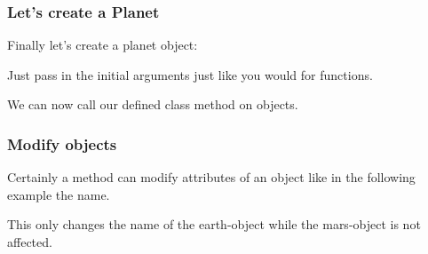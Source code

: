 \documentclass{beamer}
\begin{document}
\begin{frame}
  \frametitle{Let's create a Planet}
  Finally let's create a planet object: 
  
  Just pass in the initial arguments just like you would for functions. 
  
  We can now call our defined class method on objects. 
\end{frame}
\begin{frame}
  \frametitle{Modify objects}
  Certainly a method can modify attributes of an object like in the following example the name. 
    

    
  This only changes the name of the \glq earth\grq-object while the \glq mars\grq-object is not affected. 
\end{frame}
\end{document}
